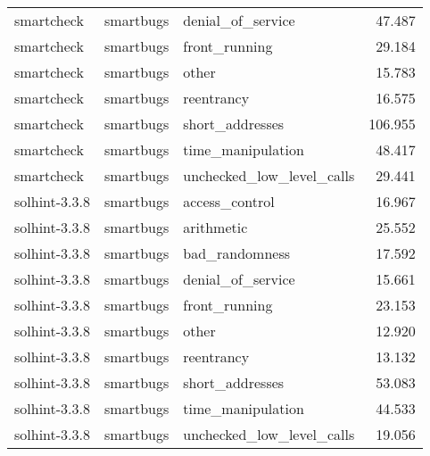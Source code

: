 \begin{tabular}[t]{lllr}
smartcheck & smartbugs & denial\_of\_service & 47.487\\
smartcheck & smartbugs & front\_running & 29.184\\
smartcheck & smartbugs & other & 15.783\\
\addlinespace
smartcheck & smartbugs & reentrancy & 16.575\\
smartcheck & smartbugs & short\_addresses & 106.955\\
smartcheck & smartbugs & time\_manipulation & 48.417\\
smartcheck & smartbugs & unchecked\_low\_level\_calls & 29.441\\
solhint-3.3.8 & smartbugs & access\_control & 16.967\\
\addlinespace
solhint-3.3.8 & smartbugs & arithmetic & 25.552\\
solhint-3.3.8 & smartbugs & bad\_randomness & 17.592\\
solhint-3.3.8 & smartbugs & denial\_of\_service & 15.661\\
solhint-3.3.8 & smartbugs & front\_running & 23.153\\
solhint-3.3.8 & smartbugs & other & 12.920\\
\addlinespace
solhint-3.3.8 & smartbugs & reentrancy & 13.132\\
solhint-3.3.8 & smartbugs & short\_addresses & 53.083\\
solhint-3.3.8 & smartbugs & time\_manipulation & 44.533\\
solhint-3.3.8 & smartbugs & unchecked\_low\_level\_calls & 19.056\\
\bottomrule
\end{tabular}
